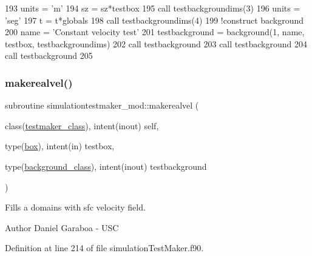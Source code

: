\begin{DoxyCode}
193     units = \textcolor{stringliteral}{'m'}
194     sz = sz*testbox%
195     \textcolor{keyword}{call }testbackgroundims(3)%
196     units = \textcolor{stringliteral}{'seg'}
197     t = t*globals%
198     \textcolor{keyword}{call }testbackgroundims(4)%
199     \textcolor{comment}{!construct background}
200     name = \textcolor{stringliteral}{'Constant velocity test'}
201     testbackground = background(1, name, testbox, testbackgroundims)
202     \textcolor{keyword}{call }testbackground%
203     \textcolor{keyword}{call }testbackground%
204     \textcolor{keyword}{call }testbackground%
205 
\end{DoxyCode}
\mbox{\label{namespacesimulationtestmaker__mod_aefae35a08583d3983b922b33b8c74225}} 
\subsubsection{\texorpdfstring{makerealvel()}{makerealvel()}}
{\footnotesize\ttfamily subroutine simulationtestmaker\+\_\+mod\+::makerealvel (\begin{DoxyParamCaption}\item[{class(\mbox{\hyperlink{structsimulationtestmaker__mod_1_1testmaker__class}{testmaker\+\_\+class}}), intent(inout)}]{self,  }\item[{type(\mbox{\hyperlink{structgeometry__mod_1_1box}{box}}), intent(in)}]{testbox,  }\item[{type(\mbox{\hyperlink{structbackground__mod_1_1background__class}{background\+\_\+class}}), intent(inout)}]{testbackground }\end{DoxyParamCaption})\hspace{0.3cm}{\ttfamily [private]}}



Fills a domain\textquotesingle{}s with sfc velocity field. 

\begin{DoxyAuthor}{Author}
Daniel Garaboa -\/ U\+SC 
\end{DoxyAuthor}


Definition at line 214 of file simulation\+Test\+Maker.\+f90.


